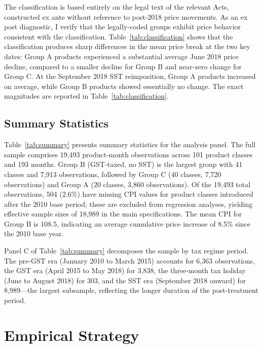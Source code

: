 \documentclass[12pt]{article}
\begin{document}
The classification is based entirely on the legal text of the relevant Acts, constructed ex ante without reference to post-2018 price movements. As an ex post diagnostic, I verify that the legally-coded groups exhibit price behavior consistent with the classification. Table~\ref{tab:classification} shows that the classification produces sharp differences in the mean price break at the two key dates: Group A products experienced a substantial average June 2018 price decline, compared to a smaller decline for Group B and near-zero change for Group C. At the September 2018 SST reimposition, Group A products increased on average, while Group B products showed essentially no change. The exact magnitudes are reported in Table~\ref{tab:classification}.



\subsection{Summary Statistics}

Table~\ref{tab:summary} presents summary statistics for the analysis panel. The full sample comprises 19,493 product-month observations across 101 product classes and 193 months. Group B (GST-taxed, no SST) is the largest group with 41 classes and 7,913 observations, followed by Group C (40 classes, 7,720 observations) and Group A (20 classes, 3,860 observations). Of the 19,493 total observations, 504 (2.6\%) have missing CPI values for product classes introduced after the 2010 base period; these are excluded from regression analyses, yielding effective sample sizes of 18,989 in the main specifications. The mean CPI for Group B is 108.5, indicating an average cumulative price increase of 8.5\% since the 2010 base year.

Panel C of Table~\ref{tab:summary} decomposes the sample by tax regime period. The pre-GST era (January 2010 to March 2015) accounts for 6,363 observations, the GST era (April 2015 to May 2018) for 3,838, the three-month tax holiday (June to August 2018) for 303, and the SST era (September 2018 onward) for 8,989---the largest subsample, reflecting the longer duration of the post-treatment period.




\section{Empirical Strategy}
\end{document}
